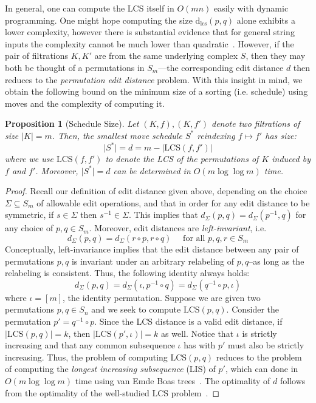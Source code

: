 \documentclass[sn-mathphys]{sn-jnl}
\newtheorem{proposition}{Proposition}
\begin{document}
%
In general, one can compute the LCS itself in $O(mn)$ easily with dynamic programming. One might hope computing the size $\mathrm{d}_{\mathrm{lcs}}(p,q)$ alone exhibits a lower complexity, however there is substantial evidence that for general string inputs the complexity cannot be much lower than quadratic~\cite{abboud2015tight}. 
However, if the pair of filtrations $K, K'$ are from the same underlying complex $S$, then they may both be thought of a permutations in $S_m$---the corresponding edit distance $d$ then reduces to the \emph{permutation edit distance} problem.
With this insight in mind, we obtain the following bound on the minimum size of a sorting (i.e. schedule) using moves and the complexity of computing it. 
\begin{proposition}[Schedule Size]\label{prop:schedule_size}
Let $(K, f), (K, f')$ denote two filtrations of size $\lvert K \rvert = m$. Then, the smallest move schedule $S^*$ reindexing $f \mapsto f'$ has size: 
$$ \lvert S^\ast \rvert = d = m - \lvert \mathrm{LCS}(f, f') \rvert $$ 
where we use $\mathrm{LCS}(f, f')$ to denote the LCS of the permutations of $K$ induced by $f$ and $f'$.
Moreover, $\lvert S^\ast \rvert = d$ can be determined in $O(m \log \log m)$ time. 
\end{proposition}
\begin{proof} \normalsize
Recall our definition of  edit distance given above, 
depending on the choice   $\Sigma \subseteq S_m$ of allowable edit operations, and that in order for any edit distance to be symmetric, if $s \in \Sigma$ then $s^{-1} \in \Sigma$. This implies that $d_\Sigma(p,q) = d_\Sigma(p^{-1}, q)$ for any choice of  $p,q \in S_m$. 
Moreover, edit distances are \emph{left-invariant}, i.e.
\[
d_\Sigma(p,q) = d_\Sigma(r \circ p, r \circ q) \quad \text{ for all } p,q,r \in S_m
\]
Conceptually, left-invariance implies that the edit distance between any pair of permutations $p,q$ is invariant under an arbitrary relabeling of $p,q$--as long as the relabeling is consistent. Thus, the following identity always holds: 
$$ d_\Sigma(p,q) = d_\Sigma(\iota, p^{-1} \circ q) = d_\Sigma(q^{-1} \circ p, \iota) $$
where $\iota = [m]$, the identity permutation. Suppose we are given two permutations $p, q \in S_n$ and we seek to compute $\mathrm{LCS}(p, q)$. Consider the permutation $p' = q^{-1} \circ p$. Since the LCS distance is a valid edit distance, if $\lvert \mathrm{LCS}(p, q) \rvert = k$, then $\lvert \mathrm{LCS}(p', \iota) \rvert = k$ as well. Notice that $\iota$ is strictly increasing and that any common subsequence $\iota$ has with $p'$ must also be strictly increasing. Thus, the problem of computing $\mathrm{LCS}(p, q)$ reduces to the problem of computing the \emph{longest increasing subsequence} (LIS) of $p'$, which can done in $O( m \log \log m)$ time using van Emde Boas trees~\cite{bespamyatnikh2000enumerating}. The optimality of $d$ follows from the optimality of the well-studied LCS problem~\cite{kumar1987linear}. 
\end{proof}
\end{document}
